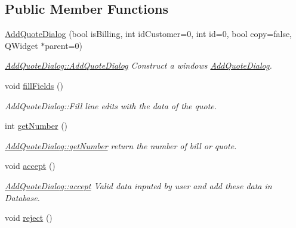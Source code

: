 \subsection*{Public Member Functions}
\begin{DoxyCompactItemize}
\item 
\hyperlink{classGui_1_1Dialogs_1_1AddQuoteDialog_acd7cc49da87e4bbe0317dc1e5f3d58cb}{Add\-Quote\-Dialog} (bool is\-Billing, int id\-Customer=0, int id=0, bool copy=false, Q\-Widget $\ast$parent=0)
\begin{DoxyCompactList}\small\item\em \hyperlink{classGui_1_1Dialogs_1_1AddQuoteDialog_acd7cc49da87e4bbe0317dc1e5f3d58cb}{Add\-Quote\-Dialog\-::\-Add\-Quote\-Dialog} Construct a windows \hyperlink{classGui_1_1Dialogs_1_1AddQuoteDialog}{Add\-Quote\-Dialog}. \end{DoxyCompactList}\item 
\hypertarget{classGui_1_1Dialogs_1_1AddQuoteDialog_a5dd0cca14b1172a7e1dd9019d8fa8ff3}{void \hyperlink{classGui_1_1Dialogs_1_1AddQuoteDialog_a5dd0cca14b1172a7e1dd9019d8fa8ff3}{fill\-Fields} ()}\label{classGui_1_1Dialogs_1_1AddQuoteDialog_a5dd0cca14b1172a7e1dd9019d8fa8ff3}

\begin{DoxyCompactList}\small\item\em Add\-Quote\-Dialog\-::\-Fill line edits with the data of the quote. \end{DoxyCompactList}\item 
int \hyperlink{classGui_1_1Dialogs_1_1AddQuoteDialog_a68b6b01e0818cb6615b2335d486aac09}{get\-Number} ()
\begin{DoxyCompactList}\small\item\em \hyperlink{classGui_1_1Dialogs_1_1AddQuoteDialog_a68b6b01e0818cb6615b2335d486aac09}{Add\-Quote\-Dialog\-::get\-Number} return the number of bill or quote. \end{DoxyCompactList}\item 
\hypertarget{classGui_1_1Dialogs_1_1AddQuoteDialog_abcc6fc79a513dd1765a4494d9499586b}{void \hyperlink{classGui_1_1Dialogs_1_1AddQuoteDialog_abcc6fc79a513dd1765a4494d9499586b}{accept} ()}\label{classGui_1_1Dialogs_1_1AddQuoteDialog_abcc6fc79a513dd1765a4494d9499586b}

\begin{DoxyCompactList}\small\item\em \hyperlink{classGui_1_1Dialogs_1_1AddQuoteDialog_abcc6fc79a513dd1765a4494d9499586b}{Add\-Quote\-Dialog\-::accept} Valid data inputed by user and add these data in Database. \end{DoxyCompactList}\item 
\hypertarget{classGui_1_1Dialogs_1_1AddQuoteDialog_a1ae935c40fb54142aad3a610a137bd36}{void \hyperlink{classGui_1_1Dialogs_1_1AddQuoteDialog_a1ae935c40fb54142aad3a610a137bd36}{reject} ()}\label{classGui_1_1Dialogs_1_1AddQuoteDialog_a1ae935c40fb54142aad3a610a137bd36}


\end{DoxyCompactItemize}
